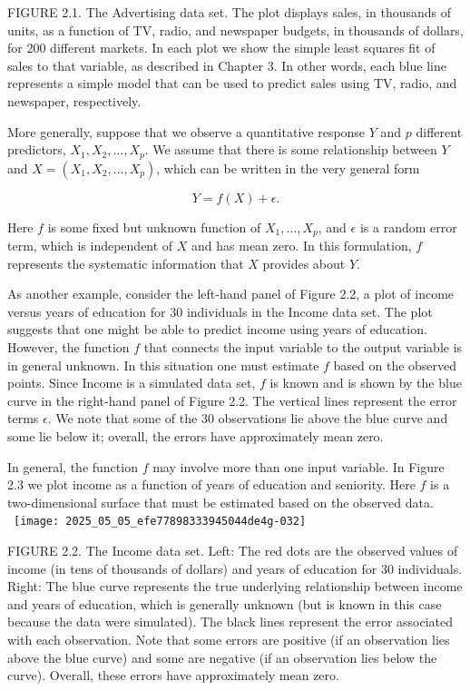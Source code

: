 \documentclass[10pt]{article}
\begin{document}
FIGURE 2.1. The Advertising data set. The plot displays sales, in thousands of units, as a function of TV, radio, and newspaper budgets, in thousands of dollars, for 200 different markets. In each plot we show the simple least squares fit of sales to that variable, as described in Chapter 3. In other words, each blue line represents a simple model that can be used to predict sales using TV, radio, and newspaper, respectively.

More generally, suppose that we observe a quantitative response $Y$ and $p$ different predictors, $X_{1}, X_{2}, \ldots, X_{p}$. We assume that there is some relationship between $Y$ and $X=\left(X_{1}, X_{2}, \ldots, X_{p}\right)$, which can be written in the very general form


\begin{equation*}
Y=f(X)+\epsilon . \tag{2.1}
\end{equation*}


Here $f$ is some fixed but unknown function of $X_{1}, \ldots, X_{p}$, and $\epsilon$ is a random error term, which is independent of $X$ and has mean zero. In this formulation, $f$ represents the systematic information that $X$ provides about $Y$.

As another example, consider the left-hand panel of Figure 2.2, a plot of income versus years of education for 30 individuals in the Income data set. The plot suggests that one might be able to predict income using years of education. However, the function $f$ that connects the input variable to the output variable is in general unknown. In this situation one must estimate $f$ based on the observed points. Since Income is a simulated data set, $f$ is known and is shown by the blue curve in the right-hand panel of Figure 2.2. The vertical lines represent the error terms $\epsilon$. We note that some of the 30 observations lie above the blue curve and some lie below it; overall, the errors have approximately mean zero.

In general, the function $f$ may involve more than one input variable. In Figure 2.3 we plot income as a function of years of education and seniority. Here $f$ is a two-dimensional surface that must be estimated based on the observed data.\
\
\texttt{[image: 2025\_05\_05\_efe77898333945044de4g-032]}

FIGURE 2.2. The Income data set. Left: The red dots are the observed values of income (in tens of thousands of dollars) and years of education for 30 individuals. Right: The blue curve represents the true underlying relationship between income and years of education, which is generally unknown (but is known in this case because the data were simulated). The black lines represent the error associated with each observation. Note that some errors are positive (if an observation lies above the blue curve) and some are negative (if an observation lies below the curve). Overall, these errors have approximately mean zero.
\end{document}
